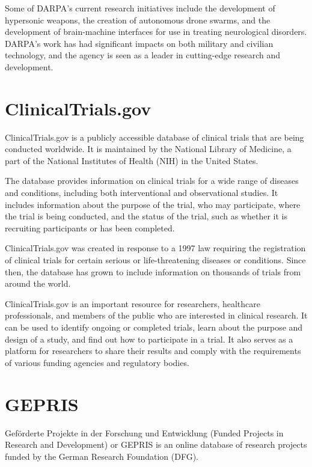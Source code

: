 \documentclass[
]{book}
\begin{document}
Some of DARPA's current research initiatives include the development of hypersonic weapons, the creation of autonomous drone swarms, and the development of brain-machine interfaces for use in treating neurological disorders. DARPA's work has had significant impacts on both military and civilian technology, and the agency is seen as a leader in cutting-edge research and development.

\hypertarget{clinicaltrials.gov}{%
\section{ClinicalTrials.gov}\label{clinicaltrials.gov}}

ClinicalTrials.gov is a publicly accessible database of clinical trials that are being conducted worldwide. It is maintained by the National Library of Medicine, a part of the National Institutes of Health (NIH) in the United States.

The database provides information on clinical trials for a wide range of diseases and conditions, including both interventional and observational studies. It includes information about the purpose of the trial, who may participate, where the trial is being conducted, and the status of the trial, such as whether it is recruiting participants or has been completed.

ClinicalTrials.gov was created in response to a 1997 law requiring the registration of clinical trials for certain serious or life-threatening diseases or conditions. Since then, the database has grown to include information on thousands of trials from around the world.

ClinicalTrials.gov is an important resource for researchers, healthcare professionals, and members of the public who are interested in clinical research. It can be used to identify ongoing or completed trials, learn about the purpose and design of a study, and find out how to participate in a trial. It also serves as a platform for researchers to share their results and comply with the requirements of various funding agencies and regulatory bodies.

\hypertarget{gepris}{%
\section{GEPRIS}\label{gepris}}

Geförderte Projekte in der Forschung und Entwicklung (Funded Projects in Research and Development) or GEPRIS is an online database of research projects funded by the German Research Foundation (DFG).
\end{document}
